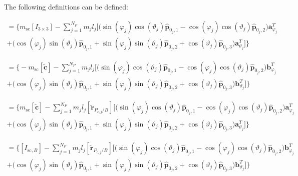 \documentclass[]{BasiliskReportMemo}
\begin{document}
	The following definitions can be defined:
	
	\begin{multline}
	[A] = \Big\{m_{\text{sc}}[I_{3\times3}] -\sum_{j=1}^{N_{P}}m_j l_j \bigg[
	\Big(\sin(\varphi_j)\cos(\vartheta_j)\bm{\hat{p}}_{0_j,1}-\cos(\varphi_j)\cos(\vartheta_j)\bm{\hat{p}}_{0_j,2}\Big)\bm a_{\varphi_j}^T \\ +\Big(\cos(\varphi_j)\sin(\vartheta_j)\bm{\hat{p}}_{0_j,1}+\sin(\varphi_j)\sin(\vartheta_j)\bm{\hat{p}}_{0_j,2}+\cos(\vartheta_j)\bm{\hat{p}}_{0_j,3}\Big)\bm a_{\vartheta_j}^T \bigg]\Big\}
	\end{multline}
	
	\begin{multline}
	[B] = 	\Big\{-m_{\text{sc}}[\tilde{\bm{c}}] -\sum_{j=1}^{N_{P}}m_j l_j \bigg[
	\Big(\sin(\varphi_j)\cos(\vartheta_j)\bm{\hat{p}}_{0_j,1}-\cos(\varphi_j)\cos(\vartheta_j)\bm{\hat{p}}_{0_j,2}\Big)\bm b_{\varphi_j}^T\\ +\Big(\cos(\varphi_j)\sin(\vartheta_j)\bm{\hat{p}}_{0_j,1}+\sin(\varphi_j)\sin(\vartheta_j)\bm{\hat{p}}_{0_j,2}+\cos(\vartheta_j)\bm{\hat{p}}_{0_j,3}\Big)\bm b_{\vartheta_j}^T \bigg] \Big\}
	\end{multline}
	
	\begin{multline}
	[C] = \Big\{m_{\text{sc}}[\tilde{\bm{c}}] - \sum\limits_{j=1}^{N_P}m_j l_j [\tilde{\bm{r}}_{P_{c,j}/B}] \bigg[
	\Big(\sin(\varphi_j)\cos(\vartheta_j)\bm{\hat{p}}_{0_j,1}-\cos(\varphi_j)\cos(\vartheta_j)\bm{\hat{p}}_{0_j,2}\Big)\bm a_{\varphi_j}^T \\
	+\Big(\cos(\varphi_j)\sin(\vartheta_j)\bm{\hat{p}}_{0_j,1}+\sin(\varphi_j)\sin(\vartheta_j)\bm{\hat{p}}_{0_j,2}+\cos(\vartheta_j)\bm{\hat{p}}_{0_j,3} \Big)\bm a_{\vartheta_j}^T
	\bigg]
	\Big\}
	\end{multline}
	
	\begin{multline}
	[D] = \Big\{[I_{\text{sc},B}] - \sum\limits_{j=1}^{N_P}m_j l_j [\tilde{\bm{r}}_{P_{c,j}/B}] \bigg[
	\Big(\sin(\varphi_j)\cos(\vartheta_j)\bm{\hat{p}}_{0_j,1}-\cos(\varphi_j)\cos(\vartheta_j)\bm{\hat{p}}_{0_j,2}\Big)\bm b_{\varphi_j}^T \\
	+\Big(\cos(\varphi_j)\sin(\vartheta_j)\bm{\hat{p}}_{0_j,1}
	+\sin(\varphi_j)\sin(\vartheta_j)\bm{\hat{p}}_{0_j,2}+\cos(\vartheta_j)\bm{\hat{p}}_{0_j,3} \Big)\bm b_{\vartheta_j}^T
	\bigg]
	\Big\}
	\end{multline}
	
\end{document}
